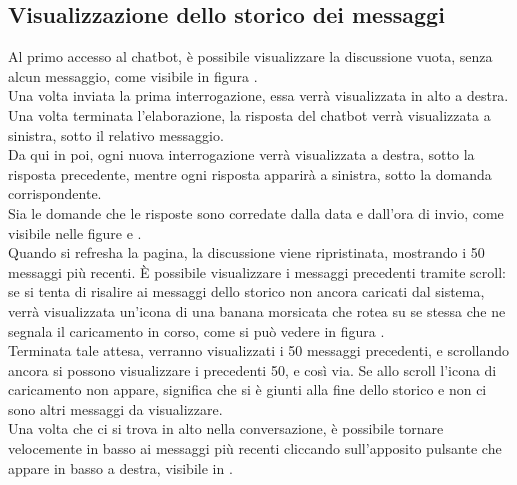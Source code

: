 \newpage


\subsection{Visualizzazione dello storico dei messaggi}
\label{subsec:visualizzazione_storico_messaggi}
Al primo accesso al chatbot, è possibile visualizzare la discussione vuota, senza alcun messaggio, come visibile in figura .\\
Una volta inviata la prima interrogazione, essa verrà visualizzata in alto a destra.
Una volta terminata l'elaborazione, la risposta del chatbot verrà visualizzata a sinistra, sotto il relativo messaggio.\\
Da qui in poi, ogni nuova interrogazione verrà visualizzata a destra, sotto la risposta precedente, mentre ogni risposta apparirà a sinistra, sotto la domanda corrispondente.\\
Sia le domande che le risposte sono corredate dalla data e dall'ora di invio, come visibile nelle figure  e .\\
Quando si refresha la pagina, la discussione viene ripristinata, mostrando i 50 messaggi più recenti. È possibile visualizzare i messaggi precedenti tramite scroll: se si tenta di risalire ai messaggi dello storico non ancora caricati dal sistema, verrà visualizzata un'icona di una banana morsicata che rotea su se stessa che ne segnala il caricamento in corso, come si può vedere in figura .\\
Terminata tale attesa, verranno visualizzati i 50 messaggi precedenti, e scrollando ancora si possono visualizzare i precedenti 50, e così via.
Se allo scroll l'icona di caricamento non appare, significa che si è giunti alla fine dello storico e non ci sono altri messaggi da visualizzare.\\
Una volta che ci si trova in alto nella conversazione, è possibile tornare velocemente in basso ai messaggi più recenti cliccando sull'apposito pulsante che appare in basso a destra, visibile in .

